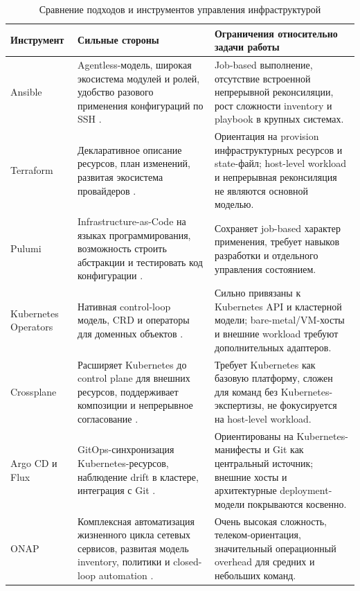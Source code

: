 \begin{table}
    \centering
    \caption{Сравнение подходов и инструментов управления инфраструктурой}
    \label{tab:infra-tools-comparison}
    \footnotesize
    \begin{tabularx}{\textwidth}{|p{}|X|X|}\hline
    Инструмент & Сильные стороны & Ограничения относительно задачи работы \\ \hline
    Ansible & Agentless-модель, широкая экосистема модулей и ролей, удобство разового применения конфигураций по SSH \cite{ansible_docs}. & Job-based выполнение, отсутствие встроенной непрерывной реконсиляции, рост сложности inventory и playbook в крупных системах. \\ \hline
    Terraform & Декларативное описание ресурсов, план изменений, развитая экосистема провайдеров \cite{terraform_docs}. & Ориентация на provision инфраструктурных ресурсов и state-файл; host-level workload и непрерывная реконсиляция не являются основной моделью. \\ \hline
    Pulumi & Infrastructure-as-Code на языках программирования, возможность строить абстракции и тестировать код конфигурации \cite{pulumi_iac}. & Сохраняет job-based характер применения, требует навыков разработки и отдельного управления состоянием. \\ \hline
    Kubernetes Operators & Нативная control-loop модель, CRD и операторы для доменных объектов \cite{kubernetes_operator_pattern}. & Сильно привязаны к Kubernetes API и кластерной модели; bare-metal/VM-хосты и внешние workload требуют дополнительных адаптеров. \\ \hline
    Crossplane & Расширяет Kubernetes до control plane для внешних ресурсов, поддерживает композиции и непрерывное согласование \cite{crossplane_docs}. & Требует Kubernetes как базовую платформу, сложен для команд без Kubernetes-экспертизы, не фокусируется на host-level workload. \\ \hline
    Argo CD и Flux & GitOps-синхронизация Kubernetes-ресурсов, наблюдение drift в кластере, интеграция с Git \cite{argocd_docs,flux_docs}. & Ориентированы на Kubernetes-манифесты и Git как центральный источник; внешние хосты и архитектурные deployment-модели покрываются косвенно. \\ \hline
    ONAP & Комплексная автоматизация жизненного цикла сетевых сервисов, развитая модель inventory, политики и closed-loop automation \cite{onap_docs}. & Очень высокая сложность, телеком-ориентация, значительный операционный overhead для средних и небольших команд. \\ \hline
    \end{tabularx}
    \normalsize
\end{table}

